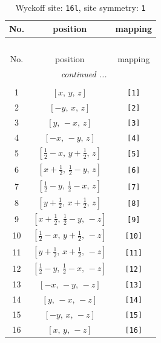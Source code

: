 \documentclass[fleqn,8pt]{jsarticle}
\begin{document}
\begin{longtable}{ccc}
\caption{Wyckoff site: {\tt 16l}, site symmetry: {\tt 1}}
 \\
 \hline \hline
No. & position & mapping \\ \hline \endfirsthead

\multicolumn{2}{l}{\tablename\ \thetable{}} \\
 \hline \hline
No. & position & mapping \\ \hline \endhead

 \hline \hline
\multicolumn{2}{r}{\footnotesize\it continued ...} \\ \endfoot

 \hline \hline
\multicolumn{2}{r}{} \\ \endlastfoot

1 & $\left[ x,\, y,\, z \right]$ & {\tt [1]} \\ \hline
2 & $\left[ - y,\, x,\, z \right]$ & {\tt [2]} \\ \hline
3 & $\left[ y,\, - x,\, z \right]$ & {\tt [3]} \\ \hline
4 & $\left[ - x,\, - y,\, z \right]$ & {\tt [4]} \\ \hline
5 & $\left[ \frac{1}{2} - x,\, y + \frac{1}{2},\, z \right]$ & {\tt [5]} \\ \hline
6 & $\left[ x + \frac{1}{2},\, \frac{1}{2} - y,\, z \right]$ & {\tt [6]} \\ \hline
7 & $\left[ \frac{1}{2} - y,\, \frac{1}{2} - x,\, z \right]$ & {\tt [7]} \\ \hline
8 & $\left[ y + \frac{1}{2},\, x + \frac{1}{2},\, z \right]$ & {\tt [8]} \\ \hline
9 & $\left[ x + \frac{1}{2},\, \frac{1}{2} - y,\, - z \right]$ & {\tt [9]} \\ \hline
10 & $\left[ \frac{1}{2} - x,\, y + \frac{1}{2},\, - z \right]$ & {\tt [10]} \\ \hline
11 & $\left[ y + \frac{1}{2},\, x + \frac{1}{2},\, - z \right]$ & {\tt [11]} \\ \hline
12 & $\left[ \frac{1}{2} - y,\, \frac{1}{2} - x,\, - z \right]$ & {\tt [12]} \\ \hline
13 & $\left[ - x,\, - y,\, - z \right]$ & {\tt [13]} \\ \hline
14 & $\left[ y,\, - x,\, - z \right]$ & {\tt [14]} \\ \hline
15 & $\left[ - y,\, x,\, - z \right]$ & {\tt [15]} \\ \hline
16 & $\left[ x,\, y,\, - z \right]$ & {\tt [16]} \\
\end{longtable}
\end{document}
